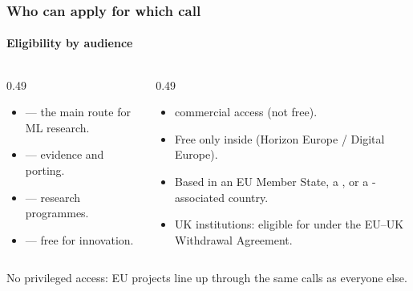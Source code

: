 \documentclass[10pt,aspectratio=169,notheorems]{beamer}
\begin{document}
\begin{frame}
    \frametitle{Who can apply for which call}
    \framesubtitle{Eligibility by audience}
    \begin{columns}[t]
        \begin{column}{0.49\textwidth}
        \begin{itemize}
            \item {} --- the main route for ML research.
            \item {} --- evidence and porting.
            \item {} --- research programmes.
        \end{itemize}
        \vspace{0.6em}
        \begin{itemize}
            \item {} --- free for innovation.
        \end{itemize}
        \end{column}

        \begin{column}{0.49\textwidth}
        \begin{itemize}
            \item {} commercial access (not free).
            \item Free only inside  (Horizon Europe / Digital Europe).
        \end{itemize}
        \vspace{0.6em}
        \begin{itemize}
            \item Based in an EU Member State, a , or a -associated country.
            \item UK institutions: eligible for  under the EU--UK Withdrawal Agreement.
        \end{itemize}
        \end{column}
    \end{columns}

    \vspace{1.5em}
    \textcolor{SlidemintMuted}{No privileged access: EU projects line up through the same calls as everyone else.}
\end{frame}
\end{document}
